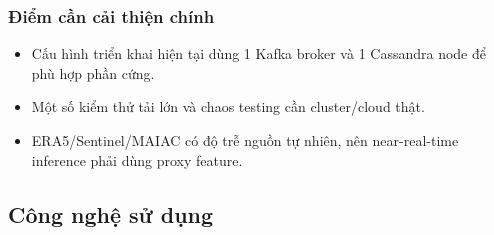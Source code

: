 \documentclass[12pt,a4paper]{article}
\newcommand{\tightlist}{\setlength{\itemsep}{0pt}\setlength{\parskip}{0pt}}
\begin{document}
\subsubsection{Điểm cần cải thiện chính}\label{giux1edbi-hux1ea1n-trong-phux1ea1m-vi-muxf4n-hux1ecdc}

\begin{itemize}
\tightlist
\item
  Cấu hình triển khai hiện tại dùng 1 Kafka broker và 1 Cassandra node để phù hợp phần cứng.
\item
  Một số kiểm thử tải lớn và chaos testing cần cluster/cloud thật.
\item
  ERA5/Sentinel/MAIAC có độ trễ nguồn tự nhiên, nên near-real-time inference phải dùng proxy feature.
\end{itemize}

\subsection{Công nghệ sử dụng}\label{cuxf4ng-nghux1ec7-sux1eed-dux1ee5ng}
\end{document}

